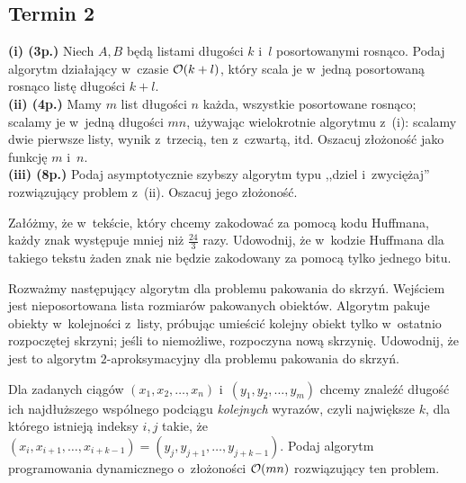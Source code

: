 \subsection{Termin 2}

\begin{zadanie}
	\textbf{(i) (3p.)} Niech $A,B$ będą listami długości $k$ i~$l$ posortowanymi
	rosnąco. Podaj algorytm działający w~czasie $\mathcal{O}(k+l)$, który scala je w~jedną
	posortowaną rosnąco listę długości $k+l$.\\
	\textbf{(ii) (4p.)} Mamy $m$ list długości $n$ każda, wszystkie posortowane
	rosnąco; scalamy je w~jedną długości $mn$, używając wielokrotnie algorytmu
	z~(i): scalamy dwie pierwsze listy, wynik z~trzecią, ten z~czwartą, itd.
	Oszacuj złożoność jako funkcję $m$ i~$n$.\\
	\textbf{(iii) (8p.)} Podaj asymptotycznie szybszy algorytm typu ,,dziel
	i~zwyciężaj'' rozwiązujący problem z~(ii). Oszacuj jego złożoność.
\end{zadanie}

\begin{zadanie}
	Załóżmy, że w~tekście, który chcemy zakodować za pomocą kodu Huffmana, każdy
	znak występuje mniej niż $\frac{24}{3}$ razy. Udowodnij, że w~kodzie Huffmana
	dla takiego tekstu żaden znak nie będzie zakodowany za pomocą tylko jednego
	bitu.
\end{zadanie}

\begin{zadanie}
	Rozważmy następujący algorytm dla problemu pakowania do skrzyń. Wejściem jest
	nieposortowana lista rozmiarów pakowanych obiektów. Algorytm pakuje obiekty
	w~kolejności z~listy, próbując umieścić kolejny obiekt tylko w~ostatnio
	rozpoczętej skrzyni; jeśli to niemożliwe, rozpoczyna nową skrzynię. Udowodnij,
	że jest to algorytm $2$-aproksymacyjny dla problemu pakowania do skrzyń.
\end{zadanie}

\begin{zadanie}
	Dla zadanych ciągów $(x_1,x_2,\dots,x_n)$ i~$(y_1,y_2,\dots,y_m)$ chcemy
	znaleźć długość ich najdłuższego wspólnego podciągu \emph{kolejnych} wyrazów,
	czyli największe $k$, dla którego istnieją indeksy $i,j$ takie, że
	$(x_i,x_{i+1},\dots,x_{i+k-1})=(y_j,y_{j+1},\dots,y_{j+k-1})$. Podaj algorytm
	programowania dynamicznego o~złożoności $\mathcal{O}(mn)$ rozwiązujący ten problem.
\end{zadanie}

